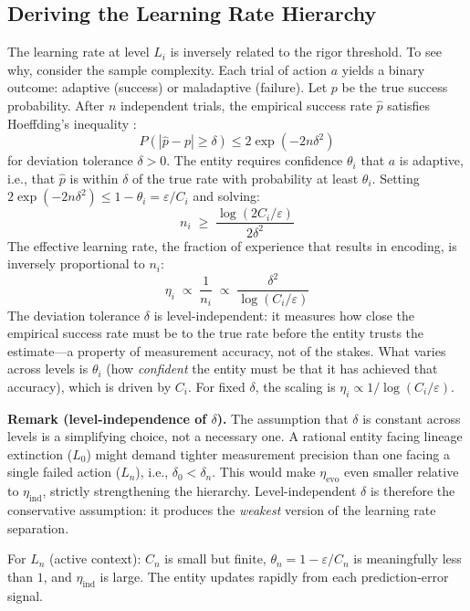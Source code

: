 \documentclass[11pt]{article}
\theoremstyle{definition}
\begin{document}
\subsection{Deriving the Learning Rate Hierarchy}

The learning rate at level $L_i$ is inversely related to the rigor
threshold. To see why, consider the sample complexity. Each trial of
action $a$ yields a binary outcome: adaptive (success) or maladaptive
(failure). Let $p$ be the true success probability. After $n$
independent trials, the empirical success rate $\hat{p}$ satisfies
Hoeffding's inequality \cite{Hoeffding1963}:
\[
P(|\hat{p} - p| \geq \delta) \leq 2\exp(-2n\delta^2)
\]
for deviation tolerance $\delta > 0$. The entity requires confidence
$\theta_i$ that $a$ is adaptive, i.e., that $\hat{p}$ is within
$\delta$ of the true rate with probability at least $\theta_i$. Setting
$2\exp(-2n\delta^2) \leq 1 - \theta_i = \varepsilon / C_i$ and solving:
\[
n_i \;\geq\; \frac{\log(2 C_i / \varepsilon)}{2\delta^2}
\]
The effective learning rate, the fraction of experience that results
in encoding, is inversely proportional to $n_i$:
\[
\eta_i \;\propto\; \frac{1}{n_i}
\;\propto\; \frac{\delta^2}{\log(C_i / \varepsilon)}
\]
The deviation tolerance $\delta$ is level-independent: it measures how
close the empirical success rate must be to the true rate before the
entity trusts the estimate---a property of measurement accuracy, not
of the stakes. What varies across levels is $\theta_i$ (how
\emph{confident} the entity must be that it has achieved that
accuracy), which is driven by $C_i$. For fixed $\delta$, the
scaling is $\eta_i \propto 1 / \log(C_i / \varepsilon)$.

\textbf{Remark (level-independence of $\delta$).}
The assumption that $\delta$ is constant across levels is a simplifying
choice, not a necessary one. A rational entity facing lineage
extinction ($L_0$) might demand tighter measurement precision than one
facing a single failed action ($L_n$), i.e., $\delta_0 < \delta_n$.
This would make $\eta_{\mathrm{evo}}$ even smaller relative to
$\eta_{\mathrm{ind}}$, strictly strengthening the hierarchy.
Level-independent $\delta$ is therefore the conservative assumption:
it produces the \emph{weakest} version of the learning rate separation.

For $L_n$ (active context): $C_n$ is small but finite,
$\theta_n = 1 - \varepsilon / C_n$ is meaningfully less than $1$, and
$\eta_{\mathrm{ind}}$ is large. The entity updates rapidly from each
prediction-error signal.
\end{document}
